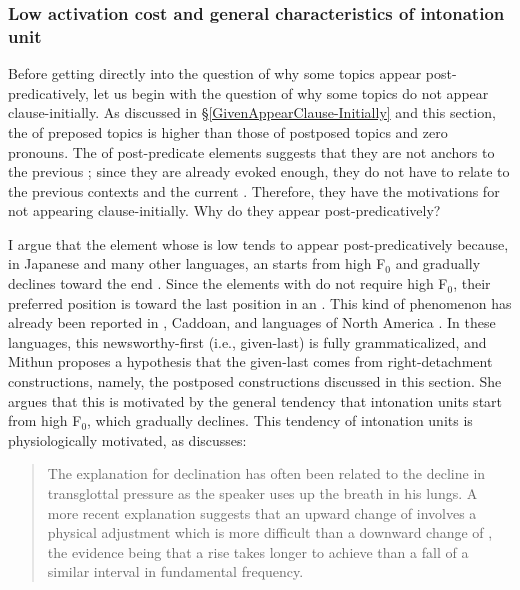 \subsubsection{Low activation cost and general characteristics of intonation unit}\label{WO:PostP:Motivations:IU}

Before getting directly into the question of
why some topics appear post-pred\-i\-cat\-ively, %
let us begin with the question of why some topics do not appear clause-initially.
As discussed in \S \ref{GivenAppearClause-Initially} and this section,
the  of preposed topics is higher than
those of postposed topics and zero pronouns.
The  of post-predicate elements suggests that
they are not anchors to the previous ;
since they are already evoked enough,
they do not have to relate to the previous contexts and the current .
Therefore, they have the motivations for not appearing clause-initially.
Why do they appear post-predicatively?

I argue that the element whose  is low tends to appear post-predicatively
because, in Japanese and many other languages,
an  starts from high F$_{0}$ and gradually declines toward the end 
\cite{libermanpierrehumbert84,cruttenden86,duboisetal93,chafe94,prieto96,truckenbrodt04,denetal10}.
Since the elements with  do not require high F$_{0}$,
their preferred position is toward the last position in an .
This kind of phenomenon has already been reported in , Caddoan, and  languages of North America \cite{mithun95}.
In these languages,
this newsworthy-first (i.e., given-last)  is fully grammaticalized, and Mithun proposes a hypothesis that the given-last  comes from right-detachment constructions, namely, the postposed constructions discussed in this section.
She argues that this  is motivated by the general tendency that intonation units start from high F$_{0}$, which gradually declines.
This tendency of intonation units is physiologically motivated,
as  discusses:
%
\begin{quote}
The explanation for declination has often been related to the decline in transglottal pressure as the speaker uses up the breath in his lungs.
A more recent explanation suggests that an upward change of  involves a physical adjustment which is more difficult than a downward change of ,
the evidence being that a rise takes longer to achieve than a fall of a similar interval in fundamental frequency.
\cite[][168]{cruttenden86}
\end{quote}
%

